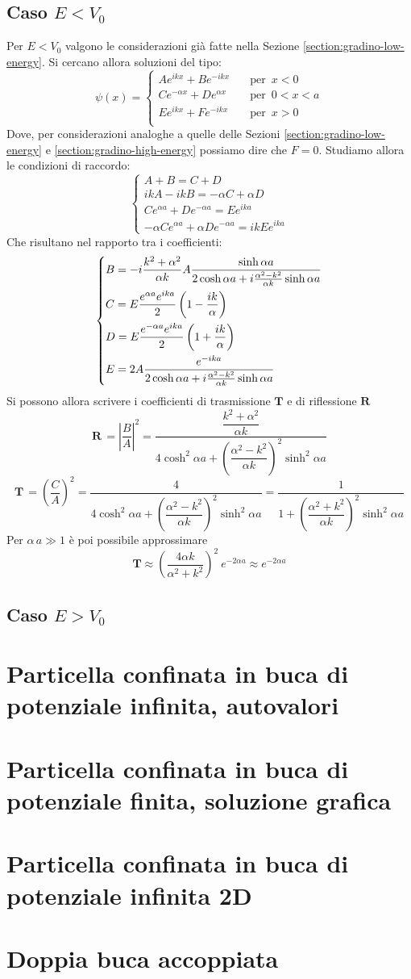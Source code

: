 \documentclass{article}
\renewcommand{\a}{\alpha}
\begin{document}
\subsection{Caso \(E<V_0\)}
Per \(E<V_0\) valgono le considerazioni già fatte nella Sezione \ref{section:gradino-low-energy}. Si cercano allora soluzioni del tipo:
\[ \psi(x) = 
\begin{cases}
 Ae^{ikx}+Be^{-ikx} &\quad \text{per } \, x<0 \\
 Ce^{-\a x}+De^{\a x} &\quad \text{per } \, 0<x<a \\
 Ee^{ikx}+Fe^{-ikx} &\quad \text{per } \, x>0 \\
\end{cases}
\]
Dove, per considerazioni analoghe a quelle delle Sezioni \ref{section:gradino-low-energy} e \ref{section:gradino-high-energy} possiamo dire che \(F=0\). Studiamo allora le condizioni di raccordo:
\[
\begin{cases}
 A + B = C + D \\
ikA - ikB = -\a C +\a D \\
Ce^{\a a}+De^{-\a a} =  Ee^{ika}  \\
- \a Ce^{\a a}+ \a De^{- \a a} = ik Ee^{ika}
\end{cases}
\]
Che risultano nel rapporto tra i coefficienti:
\[
\begin{dcases}
B = -i \dfrac{k^2+\a^2}{\a k}A\dfrac{\sinh{\a a}}{2 \cosh{\a a}+i\frac{\a^2-k^2}{\a k}\sinh{\a a}} \\
C = E \dfrac{e^{\a a}e^{ika}}{2}\left(1-\dfrac{ik}{\a}\right) \\
D = E \dfrac{e^{- \a a}e^{ika}}{2}\left(1+\dfrac{ik}{\a}\right)\\
E = 2A \dfrac{e^{-ika}}{2 \cosh{\a a}+i\frac{\a^2-k^2}{\a k}\sinh{\a a}}
\end{dcases}
\]
Si possono allora scrivere i coefficienti di trasmissione \(\mathbf{T}\) e di riflessione \(\mathbf{R}\)
\[
\mathbf{R}\, =\left|\frac{B}{A}\right|^2 = \dfrac{\dfrac{k^2+\a^2}{\a k}}{4 \cosh^2{\a a}+\left(\dfrac{\a^2-k^2}{\a k}\right)^2\sinh^2{\a a}}
\]
\[
\mathbf{T} \,=\left(\frac{C}{A}\right)^2 = \dfrac{4}{4 \cosh^2{\a a}+\left(\dfrac{\a^2-k^2}{\a k}\right)^2\sinh^2{\a a}} = \dfrac{1}{1+\left(\dfrac{\a^2+k^2}{\a k}\right)^2\sinh^2{\a a}} 
\]
Per \(\a\, a \gg 1\) è poi possibile approssimare 
\[
\mathbf{T} \approx \left(\dfrac{4\a k}{\a^2+k^2}\right)^2 \: e^{-2\a a} \approx e^{-2\a a} 
\]

\subsection{Caso \(E>V_0\)}
\section{Particella confinata in buca di potenziale infinita, autovalori}

\section{Particella confinata in buca di potenziale finita, soluzione grafica}
\section{Particella confinata in buca di potenziale infinita 2D}
\section{Doppia buca accoppiata}
\end{document}
